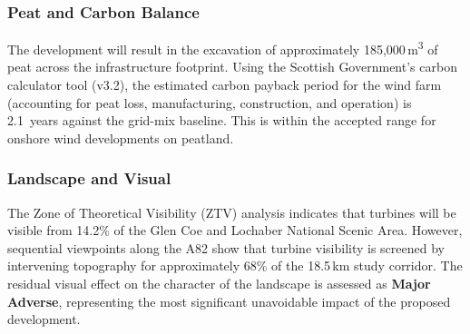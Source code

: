 \subsubsection{Peat and Carbon Balance}
The development will result in the excavation of approximately 185,000\,m\textsuperscript{3} of peat across the infrastructure footprint. Using the Scottish Government's carbon calculator tool (v3.2), the estimated carbon payback period for the wind farm (accounting for peat loss, manufacturing, construction, and operation) is 2.1~years against the grid-mix baseline. This is within the accepted range for onshore wind developments on peatland.

\subsubsection{Landscape and Visual}
The Zone of Theoretical Visibility (ZTV) analysis indicates that turbines will be visible from 14.2\% of the Glen Coe and Lochaber National Scenic Area. However, sequential viewpoints along the A82 show that turbine visibility is screened by intervening topography for approximately 68\% of the 18.5\,km study corridor. The residual visual effect on the character of the landscape is assessed as \textbf{Major Adverse}, representing the most significant unavoidable impact of the proposed development.

